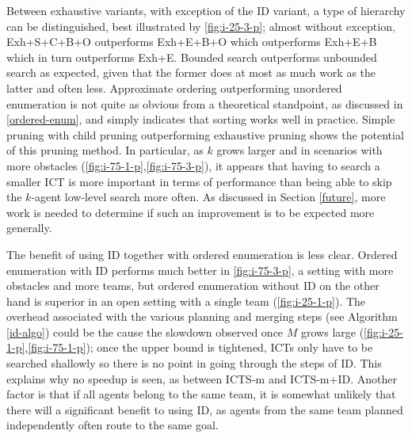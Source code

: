 \documentclass[english]{article}
\begin{document}
	Between exhaustive variants, with exception of the ID variant, a type of hierarchy can be distinguished, best illustrated by \ref{fig:i-25-3-p}; almost without exception, Exh+S+C+B+O outperforms Exh+E+B+O which outperforms Exh+E+B which in turn outperforms Exh+E. Bounded search outperforms unbounded search as expected, given that the former does at most as much work as the latter and often less. Approximate ordering outperforming unordered enumeration is not quite as obvious from a theoretical standpoint, as discussed in \ref{ordered-enum}, and simply indicates that sorting works well in practice. Simple pruning with child pruning outperforming exhaustive pruning shows the potential of this pruning method. In particular, as $k$ grows larger and in scenarios with more obstacles (\ref{fig:i-75-1-p},\ref{fig:i-75-3-p}), it appears that having to search a smaller ICT is more important in terms of performance than being able to skip the $k$-agent low-level search more often. As discussed in Section \ref{future}, more work is needed to determine if such an improvement is to be expected more generally.
	
	The benefit of using ID together with ordered enumeration is less clear. Ordered enumeration with ID performs much better in \ref{fig:i-75-3-p}, a setting with more obstacles and more teams, but ordered enumeration without ID on the other hand is superior in an open setting with a single team (\ref{fig:i-25-1-p}). The overhead associated with the various planning and merging steps (see Algorithm \ref{id-algo}) could be the cause the slowdown observed once $M$ grows large (\ref{fig:i-25-1-p},\ref{fig:i-75-1-p}); once the upper bound is tightened, ICTs only have to be searched shallowly so there is no point in going through the steps of ID. This explains why no speedup is seen, as  between ICTS-m and ICTS-m+ID. Another factor is that if all agents belong to the same team, it is somewhat unlikely that there will a significant benefit to using ID, as agents from the same team planned independently often route to the same goal.
	
\end{document}
